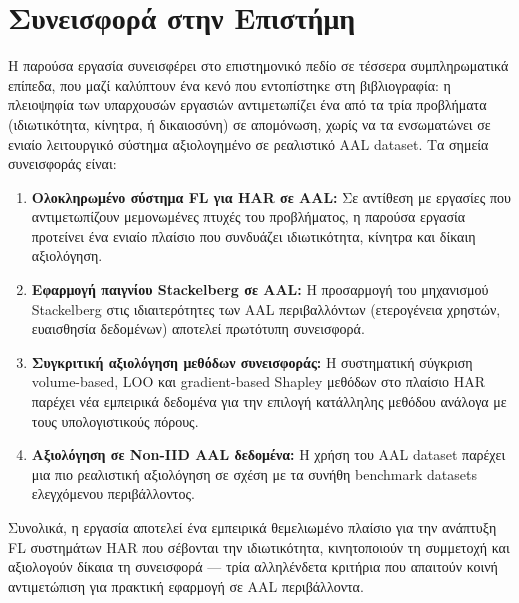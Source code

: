 
\section{Συνεισφορά στην Επιστήμη}
\label{sec:contribution}

Η παρούσα εργασία συνεισφέρει στο επιστημονικό πεδίο σε τέσσερα συμπληρωματικά επίπεδα, που μαζί καλύπτουν ένα κενό που εντοπίστηκε στη βιβλιογραφία: η πλειοψηφία των υπαρχουσών εργασιών αντιμετωπίζει ένα από τα τρία προβλήματα (ιδιωτικότητα, κίνητρα, ή δικαιοσύνη) σε απομόνωση, χωρίς να τα ενσωματώνει σε ενιαίο λειτουργικό σύστημα αξιολογημένο σε ρεαλιστικό AAL dataset. Τα σημεία συνεισφοράς είναι:

\begin{enumerate}
    \item \textbf{Ολοκληρωμένο σύστημα FL για HAR σε AAL:} Σε αντίθεση
    με εργασίες που αντιμετωπίζουν μεμονωμένες πτυχές του προβλήματος,
    η παρούσα εργασία προτείνει ένα ενιαίο πλαίσιο που συνδυάζει
    ιδιωτικότητα, κίνητρα και δίκαιη αξιολόγηση.

    \item \textbf{Εφαρμογή παιγνίου Stackelberg σε AAL:} Η προσαρμογή
    του μηχανισμού Stackelberg στις ιδιαιτερότητες των AAL περιβαλλόντων
    (ετερογένεια χρηστών, ευαισθησία δεδομένων) αποτελεί πρωτότυπη
    συνεισφορά.

    \item \textbf{Συγκριτική αξιολόγηση μεθόδων συνεισφοράς:} Η
    συστηματική σύγκριση volume-based, LOO και gradient-based Shapley
    μεθόδων στο πλαίσιο HAR παρέχει νέα εμπειρικά δεδομένα για την
    επιλογή κατάλληλης μεθόδου ανάλογα με τους υπολογιστικούς πόρους.

    \item \textbf{Αξιολόγηση σε Non-IID AAL δεδομένα:} Η χρήση του
    AAL dataset \cite{AAL_UCI2016} παρέχει μια πιο ρεαλιστική
    αξιολόγηση σε σχέση με τα συνήθη benchmark datasets ελεγχόμενου
    περιβάλλοντος.
\end{enumerate}

Συνολικά, η εργασία αποτελεί ένα εμπειρικά θεμελιωμένο πλαίσιο για την ανάπτυξη FL συστημάτων HAR που σέβονται την ιδιωτικότητα, κινητοποιούν τη συμμετοχή και αξιολογούν δίκαια τη συνεισφορά — τρία αλληλένδετα κριτήρια που απαιτούν κοινή αντιμετώπιση για πρακτική εφαρμογή σε AAL περιβάλλοντα.
